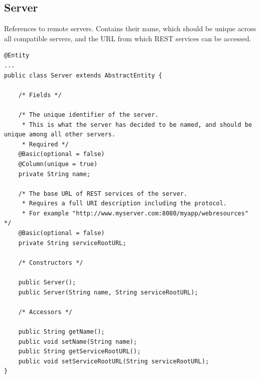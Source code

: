 \subsection{Server} References to remote servers. Contains their name, which should be unique across all compatible servers, and the URL from which REST services can be accessed.
\begin{small}\begin{verbatim}
@Entity
...
public class Server extends AbstractEntity {
    
    /* Fields */
    
    /* The unique identifier of the server.
     * This is what the server has decided to be named, and should be unique among all other servers.
     * Required */
    @Basic(optional = false)
    @Column(unique = true)
    private String name;
    
    /* The base URL of REST services of the server.
     * Requires a full URI description including the protocol.
     * For example "http://www.myserver.com:8080/myapp/webresources" */
    @Basic(optional = false)
    private String serviceRootURL;
    
    /* Constructors */
    
    public Server();
    public Server(String name, String serviceRootURL);
    
    /* Accessors */

    public String getName();
    public void setName(String name);
    public String getServiceRootURL();
    public void setServiceRootURL(String serviceRootURL);
}

\end{verbatim}\end{small}

\clearpage
